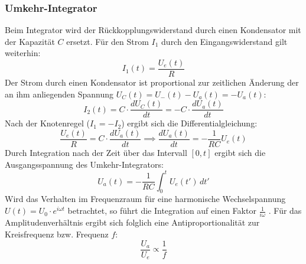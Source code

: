 \subsubsection{Umkehr-Integrator}
\label{sec:integrator}
Beim Integrator wird der Rückkopplungswiderstand durch einen Kondensator mit der Kapazität $C$ ersetzt. Für den Strom $I_1$ durch den Eingangswiderstand gilt weiterhin:
\begin{equation*}
    I_1(t) = \frac{U_e(t)}{R}
\end{equation*}
Der Strom durch einen Kondensator ist proportional zur zeitlichen Änderung der an ihm anliegenden Spannung $U_C(t) = U_-(t) - U_a(t) = -U_a(t)$:
\begin{equation*}
    I_2(t) = C \cdot \frac{d U_C(t)}{dt} = -C \cdot \frac{d U_a(t)}{dt}
\end{equation*}
Nach der Knotenregel ($I_1 = -I_2$) ergibt sich die Differentialgleichung:
\begin{equation*}
    \frac{U_e(t)}{R} = C \cdot \frac{d U_a(t)}{dt} \implies \frac{d U_a(t)}{dt} = -\frac{1}{RC} U_e(t)
\end{equation*}
Durch Integration nach der Zeit über das Intervall $[0, t]$ ergibt sich die Ausgangsspannung des Umkehr-Integrators:
\begin{equation}
    U_a(t) = -\frac{1}{RC} \int_{0}^{t} U_e(t') \, dt'
\end{equation}
Wird das Verhalten im Frequenzraum für eine harmonische Wechselspannung $U(t) = U_0 \cdot e^{i\omega t}$ betrachtet, so führt die Integration auf einen Faktor $\frac{1}{i\omega}$ \cite{tietzeschenk}. Für das Amplitudenverhältnis ergibt sich folglich eine Antiproportionalität zur Kreisfrequenz bzw. Frequenz $f$:
\begin{equation}
    \frac{U_a}{U_e} \propto \frac{1}{f}
\end{equation}

